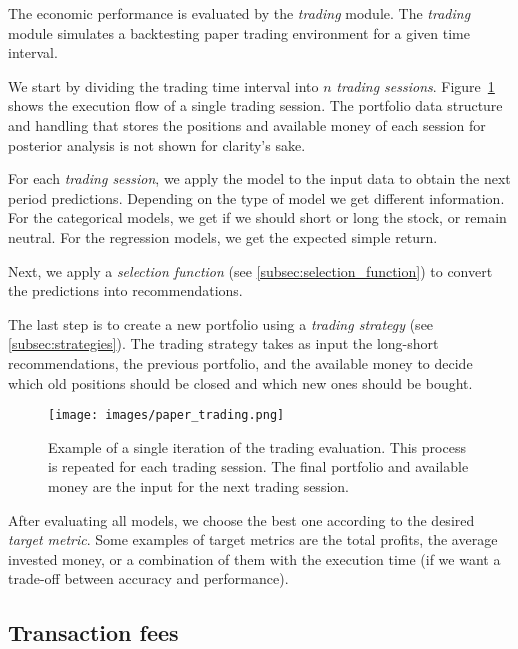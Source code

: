 The economic performance is evaluated by the \textit{trading} module. The \textit{trading} module simulates a backtesting paper trading environment for a given time interval. 

We start by dividing the trading time interval into $n$ \textit{trading sessions}. Figure~\ref{fig:evaluation} shows the execution flow of a single trading session. The portfolio data structure and handling that stores the positions and available money of each session for posterior analysis is not shown for clarity's sake.

For each \textit{trading session}, we apply the model to the input data to obtain the next period predictions. Depending on the type of model we get different information. For the categorical models, we get if we should short or long the stock, or remain neutral. For the regression models, we get the expected simple return.

Next, we apply a \textit{selection function} (see \ref{subsec:selection_function}) to convert the predictions into recommendations.

The last step is to create a new portfolio using a \textit{trading strategy} (see \ref{subsec:strategies}). The trading strategy takes as input the long-short recommendations, the previous portfolio, and the available money to decide which old positions should be closed and which new ones should be bought.

\begin{figure}
   \centering
   \texttt{[image: images/paper\_trading.png]}
   \caption{\small Example of a single iteration of the trading evaluation. This process is repeated for each trading session. The final portfolio and available money are the input for the next trading session.}
   \label{fig:evaluation}
\end{figure}
After evaluating all models, we choose the best one according to the desired \textit{target metric}. Some examples of target metrics are the total profits, the average invested money, or a combination of them with the execution time (if we want a trade-off between accuracy and performance).


\subsection{Transaction fees}

